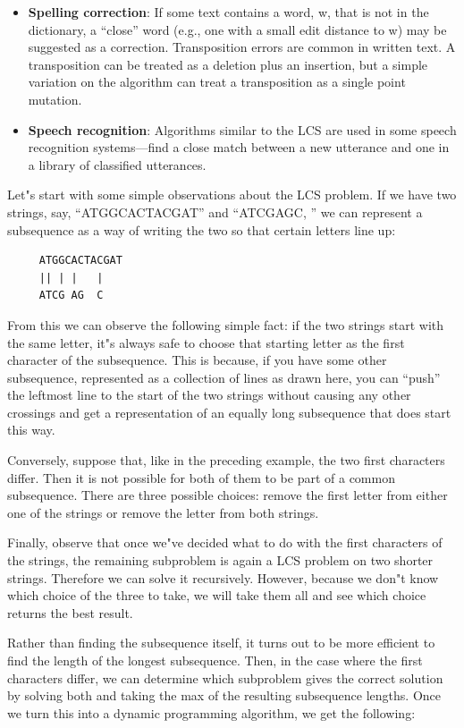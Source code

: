 \documentclass[justified, sixbynine]{tufte-book}
\theoremstyle{plain}%
\newtheorem * {corollary}{Corollary}
\theoremstyle{definition}
\theoremstyle{remark}
\newtheorem * {remark}{Remark}
\newtheorem * {note}{Note}
\begin{document}
\begin{fullwidth}
\begin{itemize}
\item  {\bf Spelling correction}: If some text contains a word, w, that is not
in the dictionary, a ``close'' word (e.g., one with a small edit distance to w)
may be suggested as a correction. Transposition errors are common in written
text. A transposition can be treated as a deletion plus an insertion, but a
simple variation on the algorithm can treat a transposition as a single
point mutation.

\item  {\bf Speech recognition}: Algorithms similar to the LCS are used in
some speech recognition systems---find a close match between a new utterance
and one in a library of classified utterances.
\end{itemize}

Let"s start with some simple observations about the LCS problem. If we have
two strings, say, ``ATGGCACTACGAT'' and ``ATCGAGC, '' we can represent a
subsequence as a way of writing the two so that certain letters line up:
\begin{lstlisting}
     ATGGCACTACGAT
     || | |   |
     ATCG AG  C
\end{lstlisting}

From this we can observe the following simple fact: if the two strings start
with the same letter, it"s always safe to choose that starting letter as the
first character of the subsequence. This is because, if you have some other
subsequence, represented as a collection of lines as drawn here, you can
``push'' the leftmost line to the start of the two strings without causing
any other crossings and get a representation of an equally long subsequence
that does start this way.

Conversely, suppose that, like in the preceding example, the two first
characters differ. Then it is not possible for both of them to be part of a
common subsequence.  There are three possible choices: remove the first letter from
either one of the strings or remove the letter from both strings.

Finally, observe that once we"ve decided what to do with the first
characters of the strings, the remaining subproblem is again a LCS problem on two shorter strings. Therefore we can solve
it recursively. However, because we don"t know which choice of the three to take, 
we will take them all and see which choice returns the best result.

Rather than finding the subsequence itself, it turns out to be more
efficient to find the length of the longest subsequence. Then, in
the case where the first characters differ, we can determine which
subproblem gives the correct solution by solving both and taking the max of
the resulting subsequence lengths. Once we turn this into a dynamic
programming algorithm, we get the following:


\end{fullwidth}
\end{document}
